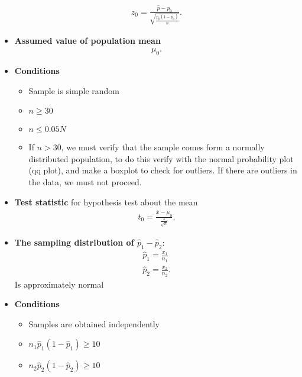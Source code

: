\documentclass{report}
\begin{document}
\begin{itemize}
            \begin{align*}
                z_{0} = \frac{\hat{p}-p_{0}}{\sqrt{\frac{p_{0}(1-p_{0})}{n}}}
            .\end{align*}
        \item \textbf{Assumed value of population mean}
          \begin{align*}
            \mu_{0}
          .\end{align*}
        \item \textbf{Conditions}
          \begin{itemize}
            \item Sample is simple random
            \item $n \geq 30 $
            \item $n \leq  0.05N$
            \item If $n> 30$, we must verify that the sample comes form a normally distributed population, to do this verify with the normal probability plot (qq plot), and make a boxplot to check for outliers. If there are outliers in the data, we must not proceed.
          \end{itemize}
        \item \textbf{Test statistic} for hypothesis test about the mean
            \begin{align*}
                t_{0} = \frac{\overline{x}- \mu_{0}}{\frac{s}{\sqrt{n}}}
            .\end{align*}
            \pagebreak \bigbreak \noindent 
            \item \textbf{The sampling distribution of $\hat{p}_{1} - \hat{p}_{2}$}:
            \begin{align*}
                \hat{p}_{1} = \frac{x_{1}}{n_{1}}  \\
                \hat{p}_{2} = \frac{x_{2}}{n_{2}}
            .\end{align*}
            Is approximately normal
            \item \textbf{Conditions}
            \begin{itemize}
              \item Samples are obtained independently
              \item $n_{1}\hat{p}_{1}(1-\hat{p}_{1}) \geq 10  $
              \item $ n_{2}\hat{p}_{2}(1-\hat{p}_{2}) \geq 10 $

\end{itemize}
\end{itemize}
\end{document}
